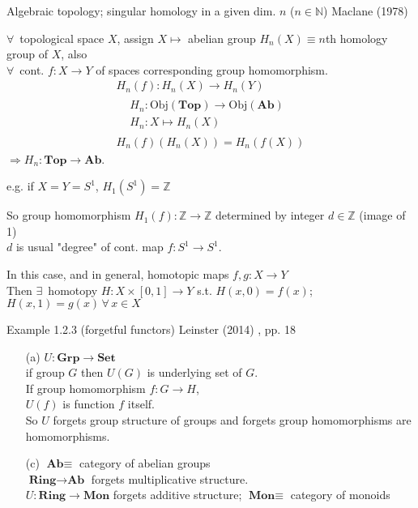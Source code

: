 \documentclass[10pt]{amsart}
\begin{document}
\begin{multicols*}{2}
Algebraic topology; singular homology in a given dim. $n$ ($n \in \mathbb{N}$) Maclane (1978) \cite{MacL1978}

$\forall \, $ topological space $X$, assign $X \mapsto $ abelian group $H_n(X) \equiv n$th homology group of $X$, also \\
$\forall \, $ cont. $f:X \to Y$ of spaces corresponding group homomorphism. 
\[
\begin{gathered}
H_n(f) : H_n(X) \to H_n(Y) \\
\begin{aligned}
& H_n: \text{Obj}(\mathbf{Top}) \to \text{Obj}(\textbf{Ab}) \\
& H_n: X \mapsto H_n(X) 
\end{aligned} \\
H_n(f)(H_n(X)) = H_n(f(X))
\end{gathered}
\]
$\Longrightarrow H_n: \textbf{Top} \to \textbf{Ab}$.

e.g. if $X=Y = S^1$, $H_1(S^1) = \mathbb{Z}$

So group homomorphism $H_1(f): \mathbb{Z} \to \mathbb{Z}$ determined by integer $d\in \mathbb{Z}$ (image of 1) \\
$d$ is usual "degree" of cont. map $f:S^1 \to S^1$. 

In this case, and in general, homotopic maps $f,g : X \to Y$ \\
Then $\exists \,$ homotopy $H:X \times [0,1] \to Y$ s.t. $H(x,0) = f(x)$; $H(x,1) = g(x) \, \forall \, x \in X$




Example 1.2.3 (forgetful functors) Leinster (2014) \cite{Lein2014}, pp. 18

\begin{enumerate}
	\item[(a)] $U : \textbf{Grp} \to \textbf{Set}$ \\
	if group $G$ then $U(G)$ is underlying set of $G$. \\
	If group homomorphism $f:G \to H$, \\
	$U(f)$ is function $f$ itself. \\
	So $U$ forgets group structure of groups and forgets group homomorphisms are homomorphisms.
	\item[(c)] $\textbf{Ab} \equiv $ category of abelian groups \\
	$\textbf{Ring} \to \textbf{Ab}$ forgets multiplicative structure. \\
	$U:\textbf{Ring} \to \textbf{Mon}$ forgets additive structure; $\textbf{Mon} \equiv $ category of monoids
\end{enumerate}





\end{multicols*}
\end{document}
